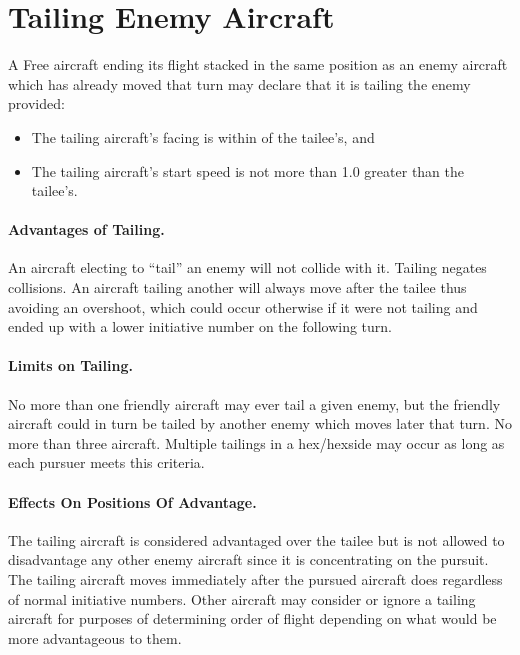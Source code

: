 \section{Tailing Enemy Aircraft}
\label{rule:tailing-enemy-aircraft}
\label{rule:tailing}

A Free aircraft ending its flight stacked in the same position as an enemy aircraft which has already moved that turn may declare that it is tailing the enemy provided:

\begin{itemize}

    \item The tailing aircraft's facing is within  of the tailee's, and
    
    \item The tailing aircraft's start speed is not more than 1.0 greater than the tailee's.

\end{itemize}

\paragraph{Advantages of Tailing.} An aircraft electing to “tail” an enemy will not collide with it. Tailing negates collisions. An aircraft tailing another will always move after the tailee thus avoiding an overshoot, which could occur otherwise if it were not tailing and ended up with a lower initiative number on the following turn.

\paragraph{Limits on Tailing.} No more than one friendly aircraft may ever tail a given enemy, but the friendly aircraft could in turn be tailed by another enemy which moves later that turn. No more than three aircraft.  Multiple tailings in a hex/hexside may occur as long as each pursuer meets this criteria.

\paragraph{Effects On Positions Of Advantage.} The tailing aircraft is considered advantaged over the tailee but is not allowed to disadvantage any other enemy aircraft since it is concentrating on the pursuit. The tailing aircraft moves immediately after the pursued aircraft does regardless of normal initiative numbers. Other aircraft may consider or ignore a tailing aircraft for purposes of determining order of flight depending on what would be more advantageous to them.


